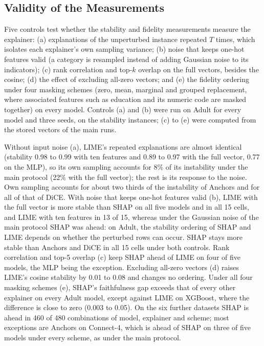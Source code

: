 \documentclass[11pt,a4paper]{article}
\begin{document}
\subsection{Validity of the Measurements}
\label{sec:validity_controls}

Five controls test whether the stability and fidelity measurements measure
the explainer: (a) explanations of the unperturbed instance repeated $T$
times, which isolates each explainer's own sampling variance; (b) noise
that keeps one-hot features valid (a category is resampled instead of adding
Gaussian noise to its indicators); (c) rank correlation and top-$k$ overlap
on the full vectors, besides the cosine; (d) the effect of excluding
all-zero vectors; and (e) the fidelity ordering under four masking schemes
(zero, mean, marginal and grouped replacement, where associated features
such as education and its numeric code are masked together) on every model.
Controls (a) and (b) were run on Adult for every model and three seeds, on
the stability instances; (c) to (e) were computed from the stored vectors of
the main runs.

Without input noise (a), LIME's repeated explanations are almost identical
(stability 0.98 to 0.99 with ten features and 0.89 to 0.97 with the full
vector, 0.77 on the MLP), so its own sampling accounts for 8\% of its
instability under the main protocol (22\% with the full vector); the rest is
its response to the noise. Own sampling accounts for about two thirds of the
instability of Anchors and for all of that of DiCE. With noise that keeps
one-hot features valid (b), LIME with the full vector is more stable than
SHAP on all five models and in all 15 cells, and LIME with ten features in
13 of 15, whereas under the Gaussian noise of the main protocol SHAP was
ahead: on Adult, the stability ordering of SHAP and LIME depends on whether
the perturbed rows can occur. SHAP stays more stable than Anchors and DiCE
in all 15 cells under both controls. Rank correlation and top-5 overlap (c)
keep SHAP ahead of LIME on four of five models, the MLP being the exception. Excluding all-zero vectors (d) raises LIME's cosine
stability by 0.01 to 0.08 and changes no ordering. Under all four masking
schemes (e), SHAP's faithfulness gap exceeds that of every other explainer on
every Adult model, except against LIME on XGBoost, where the difference is
close to zero (0.003 to 0.05). On the six further datasets SHAP is ahead in
460 of 480 combinations of model, explainer and scheme; most exceptions are
Anchors on Connect-4, which is ahead of SHAP on three of five models under
every scheme, as under the main protocol.
\end{document}
